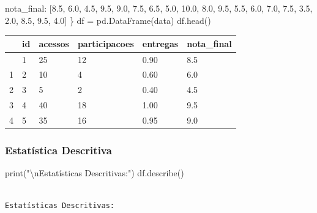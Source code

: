 \documentclass[
  letterpaper,
  DIV=11,
  numbers=noendperiod]{scrartcl}
\newenvironment{Shaded}{\begin{snugshade}}{\end{snugshade}}
\newcommand{\BuiltInTok}[1]{\textcolor[rgb]{0.00,0.23,0.31}{#1}}
\newcommand{\CharTok}[1]{\textcolor[rgb]{0.13,0.47,0.30}{#1}}
\newcommand{\FloatTok}[1]{\textcolor[rgb]{0.68,0.00,0.00}{#1}}
\newcommand{\NormalTok}[1]{\textcolor[rgb]{0.00,0.23,0.31}{#1}}
\newcommand{\OperatorTok}[1]{\textcolor[rgb]{0.37,0.37,0.37}{#1}}
\newcommand{\StringTok}[1]{\textcolor[rgb]{0.13,0.47,0.30}{#1}}
\begin{document}
\begin{Shaded}
\begin{Highlighting}[]
    \StringTok{\textquotesingle{}nota\_final\textquotesingle{}}\NormalTok{: [}\FloatTok{8.5}\NormalTok{, }\FloatTok{6.0}\NormalTok{, }\FloatTok{4.5}\NormalTok{, }\FloatTok{9.5}\NormalTok{, }\FloatTok{9.0}\NormalTok{, }\FloatTok{7.5}\NormalTok{, }\FloatTok{6.5}\NormalTok{, }\FloatTok{5.0}\NormalTok{, }\FloatTok{10.0}\NormalTok{, }\FloatTok{8.0}\NormalTok{, }\FloatTok{9.5}\NormalTok{, }\FloatTok{5.5}\NormalTok{, }\FloatTok{6.0}\NormalTok{, }\FloatTok{7.0}\NormalTok{, }\FloatTok{7.5}\NormalTok{, }\FloatTok{3.5}\NormalTok{, }\FloatTok{2.0}\NormalTok{, }\FloatTok{8.5}\NormalTok{, }\FloatTok{9.5}\NormalTok{, }\FloatTok{4.0}\NormalTok{]}
\NormalTok{\}}
\NormalTok{df }\OperatorTok{=}\NormalTok{ pd.DataFrame(data)}
\NormalTok{df.head()}
\end{Highlighting}
\end{Shaded}

\begin{longtable}[]{@{}llllll@{}}
\toprule\noalign{}
& id & acessos & participacoes & entregas & nota\_final \\
\midrule\noalign{}
\endhead
\bottomrule\noalign{}
\endlastfoot
0 & 1 & 25 & 12 & 0.90 & 8.5 \\
1 & 2 & 10 & 4 & 0.60 & 6.0 \\
2 & 3 & 5 & 2 & 0.40 & 4.5 \\
3 & 4 & 40 & 18 & 1.00 & 9.5 \\
4 & 5 & 35 & 16 & 0.95 & 9.0 \\
\end{longtable}

\subsubsection{Estatística Descritiva}\label{estatuxedstica-descritiva}

\begin{Shaded}
\begin{Highlighting}[]
\BuiltInTok{print}\NormalTok{(}\StringTok{"}\CharTok{\textbackslash{}n}\StringTok{Estatísticas Descritivas:"}\NormalTok{)}
\NormalTok{df.describe()}
\end{Highlighting}
\end{Shaded}

\begin{verbatim}

Estatísticas Descritivas:
\end{verbatim}
\end{document}

